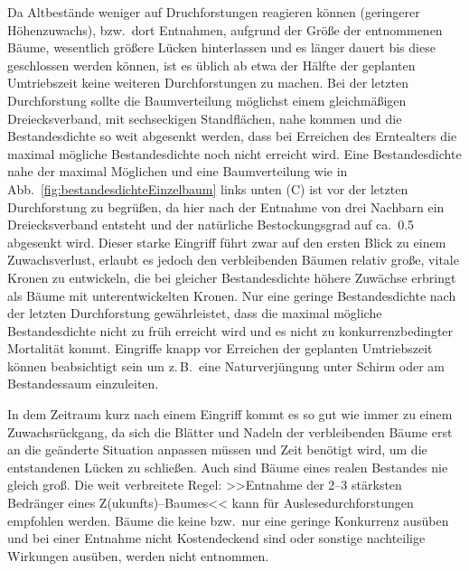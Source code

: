 \documentclass[twocolumn]{scrartcl}
\begin{document}
Da Altbestände weniger auf Druchforstungen reagieren können (geringerer
Höhenzuwachs), bzw.\ dort Entnahmen, aufgrund der Größe der entnommenen Bäume,
wesentlich größere Lücken hinterlassen und es länger dauert bis diese
geschlossen werden können, ist es üblich ab etwa der Hälfte der geplanten
Umtriebszeit keine weiteren Durchforstungen zu machen. Bei der letzten
Durchforstung sollte die Baumverteilung möglichst einem gleichmäßigen
Dreiecksverband, mit sechseckigen Standflächen, nahe kommen und die
Bestandesdichte so weit abgesenkt werden, dass bei Erreichen des Erntealters die
maximal mögliche Bestandesdichte noch nicht erreicht wird. Eine Bestandesdichte
nahe der maximal Möglichen und eine Baumverteilung wie in
Abb.~\ref{fig:bestandesdichteEinzelbaum} links unten (C) ist vor der letzten
Durchforstung zu begrüßen, da hier nach der Entnahme von drei Nachbarn ein
Dreiecksverband entsteht und der natürliche Bestockungsgrad auf ca.\ 0.5
abgesenkt wird. Dieser starke Eingriff führt zwar auf den ersten Blick zu einem
Zuwachsverlust, erlaubt es jedoch den verbleibenden Bäumen relativ große, vitale
Kronen zu entwickeln, die bei gleicher Bestandesdichte höhere Zuwächse erbringt
als Bäume mit unterentwickelten Kronen. Nur eine geringe Bestandesdichte nach
der letzten Durchforstung gewährleistet, dass die maximal mögliche
Bestandesdichte nicht zu früh erreicht wird und es nicht zu konkurrenzbedingter
Mortalität kommt. Eingriffe knapp vor Erreichen der geplanten Umtriebszeit
können beabsichtigt sein um z.\,B.\ eine Naturverjüngung unter Schirm oder am
Bestandessaum einzuleiten.

In dem Zeitraum kurz nach einem Eingriff kommt es so gut wie immer zu einem
Zuwachsrückgang, da sich die Blätter und Nadeln der verbleibenden Bäume erst an
die geänderte Situation anpassen müssen und Zeit benötigt wird, um die
entstandenen Lücken zu schließen. Auch sind Bäume eines realen Bestandes nie
gleich groß. Die weit verbreitete Regel: >>Entnahme der 2--3 stärksten Bedränger
eines Z(ukunfts)--Baumes<< kann für Auslesedurchforstungen empfohlen werden.
Bäume die keine bzw.\ nur eine geringe Konkurrenz ausüben und bei einer Entnahme
nicht Kostendeckend sind oder sonstige nachteilige Wirkungen ausüben, werden
nicht entnommen.
\end{document}
